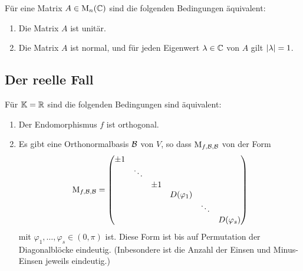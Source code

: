 \begin{corollary}
  Für eine Matrix $A \in \operatorname{M}_{n}(\mathbb{C})$ sind die folgenden Bedingungen äquivalent:
  \begin{enumerate}
    \item
      Die Matrix $A$ ist unitär.
    \item
      Die Matrix $A$ ist normal, und für jeden Eigenwert $\lambda \in \mathbb{C}$ von $A$ gilt $\left| \lambda \right| = 1$.
  \end{enumerate}
\end{corollary}



\subsection{Der reelle Fall}

\begin{theorem}
  Für $\mathbb{K} = \mathbb{R}$ sind die folgenden Bedingungen sind äquivalent:
  \begin{enumerate}
    \item
      Der Endomorphismus $f$ ist orthogonal.
    \item
      Es gibt eine Orthonormalbasis $\mathcal{B}$ von $V$, so dass $\operatorname{M}_{f, \mathcal{B}, \mathcal{B}}$ von der Form
      \begin{equation}
      \label{equation: normal form for orthogonal endomorphisms}
          \operatorname{M}_{f, \mathcal{B}, \mathcal{B}}
        = \begin{pmatrix}
            \pm 1 &         &       &               &         &               \\
                  & \ddots  &       &               &         &               \\
                  &         & \pm 1 &               &         &               \\
                  &         &       & D(\varphi_1)  &         &               \\
                  &         &       &               & \ddots  &               \\
                  &         &       &               &         & D(\varphi_s)
          \end{pmatrix}
      \end{equation}
      mit $\varphi_1, \dotsc, \varphi_s \in (0, \pi)$ ist.
      Diese Form ist bis auf Permutation der Diagonalblöcke eindeutig.
      (Inbesondere ist die Anzahl der Einsen und Minus-Einsen jeweils eindeutig.)
  \end{enumerate}
\end{theorem}

